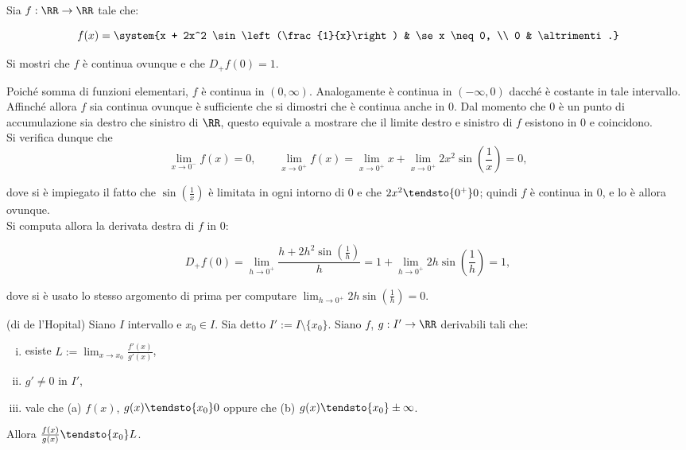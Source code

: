 \documentclass[11pt]{article}
\begin{document}
	\begin{exercise}
		Sia $f: \RR \to \RR$ tale che:
		
		\[ f(x) = \system{x + 2x^2 \sin\left(\frac{1}{x}\right) & \se x \neq 0, \\ 0 & \altrimenti.} \]
		
		\vskip 0.05in
		
		Si mostri che $f$ è continua ovunque e che $D_+ f(0) = 1$.
	\end{exercise}

	\begin{solution}
		Poiché somma di funzioni elementari, $f$ è continua in $(0, \infty)$. Analogamente è continua in
		$(-\infty, 0)$ dacché è costante in tale intervallo. Affinché allora $f$ sia continua ovunque è
		sufficiente che si dimostri che è continua anche in $0$. Dal momento che $0$ è un punto di accumulazione
		sia destro che sinistro di $\RR$, questo equivale a mostrare che il limite destro e sinistro di $f$
		esistono in $0$ e coincidono. \\
		
		Si verifica dunque che
		\[ \lim_{x \to 0^-} f(x) = 0, \qquad \lim_{x \to 0^+} f(x) = \lim_{x \to 0^+} x + \lim_{x \to 0^+} 2x^2 \sin\left(\frac{1}{x}\right) = 0, \]
		
		dove si è impiegato il fatto che $\sin\left(\frac{1}{x}\right)$ è limitata in ogni intorno di $0$ e che
		$2x^2 \tendsto{0^+} 0$; quindi $f$ è continua in $0$, e lo è allora ovunque. \\
		
		Si computa allora la derivata destra di $f$ in $0$:
		
		\[ D_+ f(0) =  \lim_{h \to 0^+} \frac{h + 2h^2 \sin\left(\frac{1}{h}\right)}{h} = 1 + \lim_{h \to 0^+} 2 h \sin\left(\frac{1}{h}\right) = 1,   \]
		
		dove si è usato lo stesso argomento di prima per computare $\lim_{h \to 0^+} 2 h \sin\left(\frac{1}{h}\right) = 0$.
	\end{solution}

	\begin{theorem} (di de l'Hopital) %
		Siano $I$ intervallo e $x_0 \in I$. Sia detto $I' := I \setminus \{ x_0 \}$. Siano $f$, $g : I' \to \RR$ derivabili tali che:
		
		\begin{enumerate}[(i)]
			\item esiste $L := \lim_{x \to x_0} \frac{f'(x)}{g'(x)}$,
			\item $g' \neq 0$ in $I'$,
			\item vale che (a) $f(x)$, $g(x) \tendsto{x_0} 0$ oppure che (b)
			$g(x) \tendsto{x_0} \pm \infty$.
		\end{enumerate}
	
		Allora $\frac{f(x)}{g(x)} \tendsto{x_0} L$.
	\end{theorem}
\end{document}
